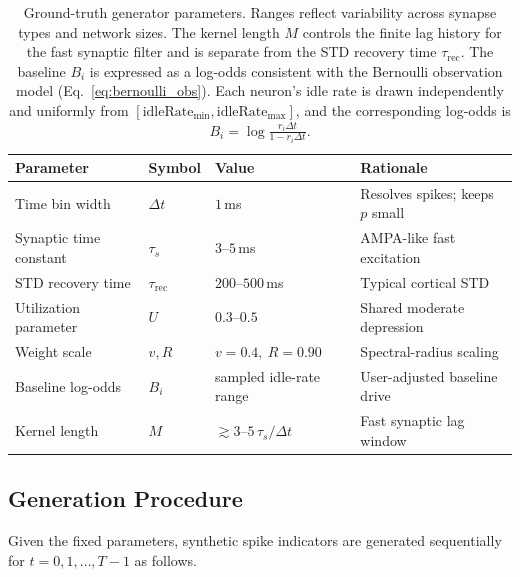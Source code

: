 \documentclass[11pt]{article}
\begin{document}
\begin{table}[h]
\centering
\small
\setlength{\tabcolsep}{3pt}
\begin{tabular}{@{}llll@{}}
\toprule
Parameter & Symbol & Value & Rationale \\
\midrule
Time bin width         & $\Delta t$            & $1$\,ms                           & Resolves spikes; keeps $p$ small \\
Synaptic time constant & $\tau_s$              & $3$--$5$\,ms                      & AMPA-like fast excitation \\
STD recovery time      & $\tau_{\mathrm{rec}}$ & $200$--$500$\,ms                  & Typical cortical STD \\
Utilization parameter  & $U$                   & $0.3$--$0.5$                      & Shared moderate depression \\
Weight scale           & $v, R$                & $v=0.4,\ R=0.90$                  & Spectral-radius scaling \\
Baseline log-odds      & $B_i$                 & sampled idle-rate range           & User-adjusted baseline drive \\
Kernel length          & $M$                   & $\gtrsim 3$--$5\,\tau_s/\Delta t$ & Fast synaptic lag window \\
\bottomrule
\end{tabular}
\caption{Ground-truth generator parameters. Ranges reflect variability across
synapse types and network sizes. The kernel length $M$ controls the finite lag
history for the fast synaptic filter and is separate from the STD recovery time
$\tau_{\mathrm{rec}}$. The baseline $B_i$ is expressed as a log-odds consistent
with the Bernoulli observation model (Eq.~\ref{eq:bernoulli_obs}).
Each neuron's idle rate is drawn independently and uniformly from
$[\text{idleRate}_{\min}, \text{idleRate}_{\max}]$, and the corresponding
log-odds is $B_i = \log\frac{r_i\Delta t}{1 - r_i\Delta t}$.}
\label{tab:gen_params}
\end{table}

\subsection{Generation Procedure}
\label{sec:gen_procedure}

Given the fixed parameters, synthetic spike indicators are generated sequentially
for $t = 0, 1, \dots, T-1$ as follows.
\end{document}
